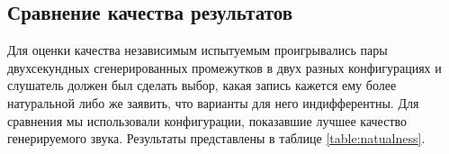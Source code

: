 \documentclass[../diploma.tex]{subfiles}
\begin{document}


\subsection{Сравнение качества результатов}
Для оценки качества независимым испытуемым проигрывались пары двухсекундных сгенерированных промежутков в двух разных конфигурациях и слушатель должен был сделать выбор, какая запись кажется ему более натуральной либо же заявить, что варианты для него индифферентны.
Для сравнения мы использовали конфигурации, показавшие лучшее качество генерируемого звука.
Результаты представлены в таблице \ref{table:natualness}.

\end{document}
